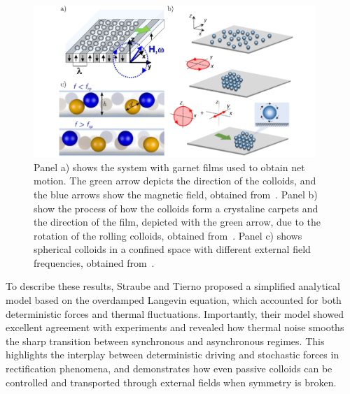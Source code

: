 \begin{figure}
  \begin{center}
    \includegraphics[width=0.95\textwidth]{figures/magneticallydrivencolloids.pdf}
  \end{center}
  \caption[Magnetically driven colloids examples.]{Panel a) shows the system with garnet films used to obtain net motion. The green arrow depicts the direction of the colloids, and the blue arrows show the magnetic field, obtained from~\cite{tierno2012depinning}. Panel b) show the process of how the colloids form a crystaline carpets and the direction of the film, depicted with the green arrow, due to the rotation of the rolling colloids, obtained from~\cite{massana2019tunable}. Panel c) shows spherical colloids in a confined space with different external field frequencies, obtained from~\cite{massana2020emergent}.}\label{fig:magneticallydrivencolloidalsystems}
\end{figure}


To describe these results, Straube and Tierno proposed a simplified analytical model based on the overdamped Langevin equation, which accounted for both deterministic forces and thermal fluctuations. Importantly, their model showed excellent agreement with experiments and revealed how thermal noise smooths the sharp transition between synchronous and asynchronous regimes. This highlights the interplay between deterministic driving and stochastic forces in rectification phenomena, and demonstrates how even passive colloids can be controlled and transported through external fields when symmetry is broken.

